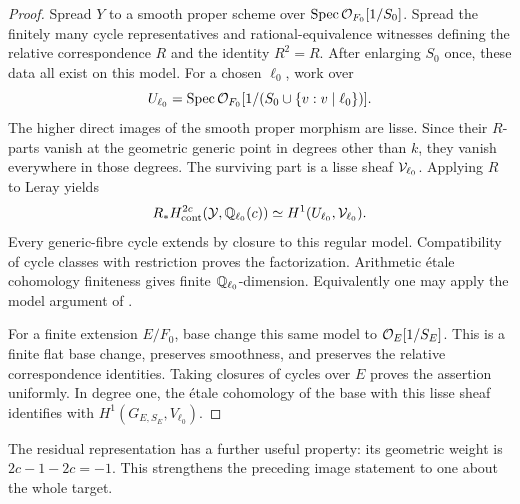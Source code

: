 \begin{proof}
Spread \(Y\) to a smooth proper scheme over
\(\operatorname{Spec}\mathcal O_{F_0}[1/S_0]\). Spread the finitely many cycle
representatives and rational-equivalence witnesses defining the
relative correspondence \(R\) and the identity \(R^2=R\).
After enlarging \(S_0\) once, these data all exist on this model.
For a chosen \(\ell_0\), work over
\[
 U_{\ell_0}=\operatorname{Spec}\mathcal O_{F_0}
                [1/(S_0\cup\{v:v\mid\ell_0\})].
\]
The higher direct images of the smooth proper morphism are lisse.
Since their \(R\)-parts vanish at the geometric generic point in
degrees other than \(k\), they vanish everywhere in those
degrees. The surviving part is a lisse sheaf \(\mathcal V_{\ell_0}\).
Applying \(R\) to Leray yields
\[
 R_*H^{2c}_{\mathrm{cont}}(\mathcal Y,\mathbb Q_{\ell_0}(c))
          \simeq H^1(U_{\ell_0},\mathcal V_{\ell_0}).
\]
Every generic-fibre cycle extends by closure to this regular
model. Compatibility of cycle classes with restriction proves the
factorization. Arithmetic étale cohomology finiteness gives finite
\(\mathbb Q_{\ell_0}\)-dimension. Equivalently one may apply the model
argument of \cite[Proposition~2.5 and Corollary~2.6]{Raskind}.

For a finite extension \(E/F_0\), base change this same model to
\(\mathcal O_E[1/S_E]\). This is a finite flat base change, preserves
smoothness, and preserves the relative correspondence identities.
Taking closures of cycles over \(E\) proves the assertion
uniformly. In degree one, the étale cohomology of the base with
this lisse sheaf identifies with \(H^1(G_{E,S_E},V_{\ell_0})\).
\end{proof}

The residual representation has a further useful property: its
geometric weight is \(2c-1-2c=-1\). This strengthens the preceding
image statement to one about the whole target.


